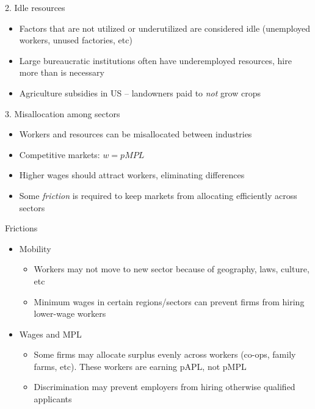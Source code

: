 \documentclass[10pt]{beamer}
\begin{document}
\begin{frame}[label={sec:org0506790}]{}
\alert{2. Idle resources}
\begin{itemize}
\item Factors that are not utilized or underutilized are considered idle (unemployed workers, unused factories, etc)
\item Large bureaucratic institutions often have underemployed resources, hire more than is necessary
\item Agriculture subsidies in US -- landowners paid to \emph{not} grow crops
\end{itemize}
\end{frame}

\begin{frame}[label={sec:org799aeeb}]{}
\alert{3. Misallocation among sectors}
\begin{itemize}
\item Workers and resources can be misallocated between industries
\item Competitive markets: \(w = pMPL\)
\item Higher wages should attract workers, eliminating differences
\item Some \emph{friction} is required to keep markets from allocating efficiently across sectors
\end{itemize}
\end{frame}

\begin{frame}[label={sec:orgd4a2702}]{}
\alert{Frictions}
\begin{itemize}
\item Mobility
\begin{itemize}
\item Workers may not move to new sector because of geography, laws, culture, etc
\item Minimum wages in certain regions/sectors can prevent firms from hiring lower-wage workers
\end{itemize}
\item Wages and MPL
\begin{itemize}
\item Some firms may allocate surplus evenly across workers (co-ops, family farms, etc). These workers are earning pAPL, not pMPL
\item Discrimination may prevent employers from hiring otherwise qualified applicants
\end{itemize}
\end{itemize}
\end{frame}
\end{document}

